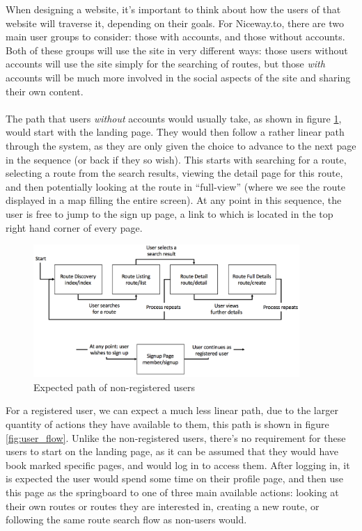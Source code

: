 \noindent 
When designing a website, it's important to think about how the users of that website will traverse it, depending on their goals. For Niceway.to, there are two main user groups to consider: those with accounts, and those without accounts. Both of these groups will use the site in very different ways: those users without accounts will use the site simply for the searching of routes, but those \emph{with} accounts will be much more involved in the social aspects of the site and sharing their own content.\ \\
\ \\
The path that users \emph{without} accounts would usually take, as shown in figure \ref{fig:nonuser_flow}, would start with the landing page. They would then follow a rather linear path through the system, as they are only given the choice to advance to the next page in the sequence (or back if they so wish). This starts with searching for a route, selecting a route from the search results, viewing the detail page for this route, and then potentially looking at the route in ``full-view'' (where we see the route displayed in a map filling the entire screen). At any point in this sequence, the user is free to jump to the sign up page, a link to which is located in the top right hand corner of every page.

\begin{figure}[!ht]
	\begin{center}
		\includegraphics[width=0.9\textwidth]{images/design/nonuser_flow.png}
	\end{center}
	\vspace{-6mm}
	\caption{Expected path of non-registered users}
	\label{fig:nonuser_flow}
	\vspace{-5mm}
\end{figure}

\noindent 
For a registered user, we can expect a much less linear path, due to the larger quantity of actions they have available to them, this path is shown in figure \ref{fig:user_flow}. Unlike the non-registered users, there's no requirement for these users to start on the landing page, as it can be assumed that they would have book marked specific pages, and would log in to access them. After logging in, it is expected the user would spend some time on their profile page, and then use this page as the springboard to one of three main available actions: looking at their own routes or routes they are interested in, creating a new route, or following the same route search flow as non-users would.

